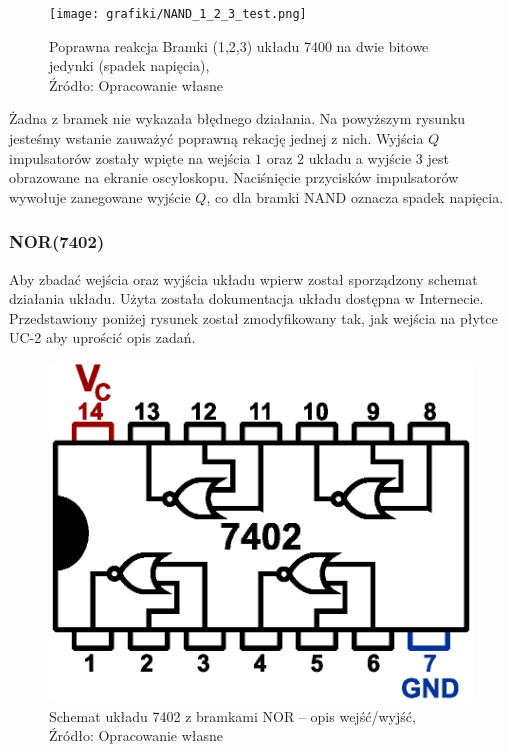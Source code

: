 \documentclass{article}
\begin{document}
        \begin{figure}[!ht]
          \centering
          \texttt{[image: grafiki/NAND\_1\_2\_3\_test.png]}
          \caption{Poprawna reakcja Bramki (1,2,3) układu 7400 na dwie bitowe jedynki (spadek napięcia),
          \\Źródło: Opracowanie własne}
        \end{figure}

      Żadna z bramek nie wykazała błędnego działania. Na powyższym rysunku jesteśmy wstanie zauważyć poprawną rekację jednej z nich. Wyjścia $Q$ impulsatorów zostały wpięte na wejścia $1$ oraz $2$ układu a wyjście $3$ jest obrazowane na ekranie oscyloskopu. Naciśnięcie przycisków impulsatorów wywołuje zanegowane wyjście $Q$, co dla bramki NAND oznacza spadek napięcia.

      \subsubsection{NOR(7402)}
        Aby zbadać wejścia oraz wyjścia układu wpierw został sporządzony schemat działania układu. Użyta została dokumentacja układu dostępna w Internecie. Przedstawiony poniżej rysunek został zmodyfikowany tak, jak wejścia na płytce UC-2 aby uprościć opis zadań.

        \begin{figure}[!ht]
            \centering
            \includegraphics[scale=0.45]{grafiki/TTL_NOR_7402.eps}
            \caption{Schemat układu 7402 z bramkami NOR -- opis wejść/wyjść,
            \\Źródło: Opracowanie własne}
        \end{figure}
\end{document}
